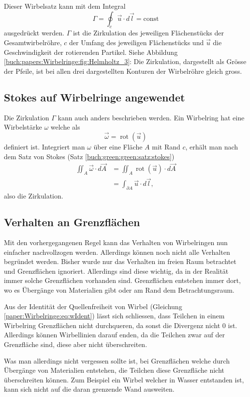 Dieser Wirbelsatz kann mit dem Integral 
\[
\Gamma
= 
\oint_{c} \vec{u} \cdot d \vec{l}
=
\text{const}
\]
ausgedrückt werden. 
\(\Gamma\) ist die Zirkulation des jeweiligen Flächenstücks der Gesamtwirbelröhre, \(c\) der Umfang des jeweiligen Flächenstücks und \(\vec{u}\) die Geschwindigkeit der rotierenden Partikel. 
Siehe Abbildung \ref{buch:papers:Wirbelringe:fig:Helmholtz_3}: 
Die Zirkulation, dargestellt als Grösse der Pfeile, ist bei allen drei dargestellten Konturen der Wirbelröhre gleich gross.


\subsection{Stokes auf Wirbelringe angewendet \label{paper:Wirbelringe:Stokes}}

Die Zirkulation \(\Gamma\) kann auch anders beschrieben werden. 
Ein Wirbelring hat eine Wirbelstärke \(\omega\) welche als
\[
\vec{\omega}
=
\operatorname{rot}( \vec{u} )
\]
definiert ist.
Integriert man $\omega$ über eine Fläche \(A\) mit Rand \(c\), erhält man nach dem Satz von Stokes (Satz \ref{buch:green:green:satz:stokes})
\begin{align*}
\iint_{A} \vec{\omega} \cdot d \vec{A}
&=
\iint_{A} \operatorname{rot}(\vec{u})\cdot  d \vec{A}\\
&=
\int_{\partial A} \vec{u} \cdot d\vec{l},
\end{align*}
also die Zirkulation.

\subsection{Verhalten an Grenzflächen \label{paper:Wirbelringe:Grenzflaechen}}

Mit den vorhergegangenen Regel kann das Verhalten von Wirbelringen nun einfacher nachvollzogen werden. 
Allerdings können noch nicht alle Verhalten begründet werden. 
Bisher wurde nur das Verhalten im freien Raum betrachtet und Grenzflächen ignoriert. 
Allerdings sind diese wichtig, da in der Realität immer solche Grenzflächen vorhanden sind. 
Grenzflächen entstehen immer dort, wo es Übergänge von Materialien gibt oder am Rand dem Betrachtungsraum.

Aus der Identität der Quellenfreiheit von Wirbel (Gleichung \ref{paper:Wirbelringe:eq:wIdent}) lässt sich schliessen, dass Teilchen in einem Wirbelring Grenzflächen nicht durchqueren, da sonst die Divergenz nicht \(0\) ist. 
Allerdings können Wirbellinien darauf enden, da die Teilchen zwar auf der Grenzfläche sind, diese aber nicht überschreiten. 

Was man allerdings nicht vergessen sollte ist, bei Grenzflächen welche durch Übergänge von Materialien entstehen, die Teilchen diese Grenzfläche nicht überschreiten können. 
Zum Beispiel ein Wirbel welcher in Wasser entstanden ist, kann sich nicht auf die daran grenzende Wand ausweiten.  
